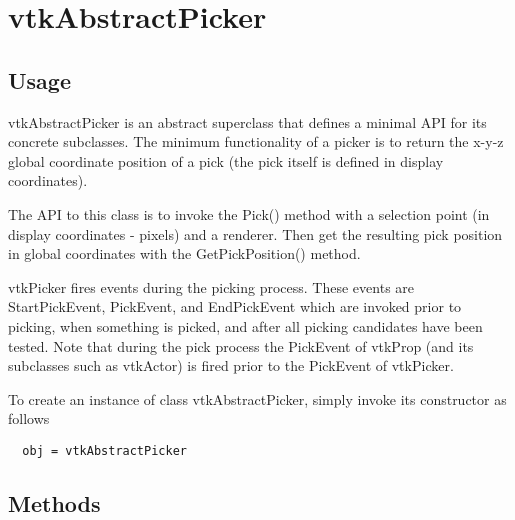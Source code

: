 \section{vtkAbstractPicker}

\subsection{Usage}

 vtkAbstractPicker is an abstract superclass that defines a minimal API
 for its concrete subclasses. The minimum functionality of a picker is
 to return the x-y-z global coordinate position of a pick (the pick
 itself is defined in display coordinates).

 The API to this class is to invoke the Pick() method with a selection
 point (in display coordinates - pixels) and a renderer. Then get the
 resulting pick position in global coordinates with the GetPickPosition()
 method.

 vtkPicker fires events during the picking process.  These
 events are StartPickEvent, PickEvent, and EndPickEvent which are
 invoked prior to picking, when something is picked, and after all picking
 candidates have been tested. Note that during the pick process the
 PickEvent of vtkProp (and its subclasses such as vtkActor) is fired
 prior to the PickEvent of vtkPicker.

To create an instance of class vtkAbstractPicker, simply
invoke its constructor as follows
\begin{verbatim}
  obj = vtkAbstractPicker
\end{verbatim}
\subsection{Methods}


